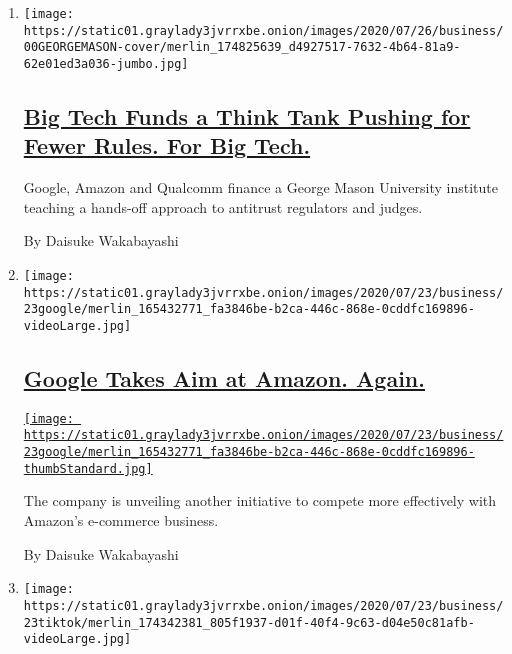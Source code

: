 \begin{enumerate}
\def\labelenumi{\arabic{enumi}.}
\item
  \texttt{[image: https://static01.graylady3jvrrxbe.onion/images/2020/07/26/business/00GEORGEMASON-cover/merlin\_174825639\_d4927517-7632-4b64-81a9-62e01ed3a036-jumbo.jpg]}

  \hypertarget{big-tech-funds-a-think-tank-pushing-for-fewer-rules-for-big-tech}{%
  \subsection{\texorpdfstring{\href{/2020/07/24/technology/global-antitrust-institute-google-amazon-qualcomm.html}{Big
  Tech Funds a Think Tank Pushing for Fewer Rules. For Big
  Tech.}}{Big Tech Funds a Think Tank Pushing for Fewer Rules. For Big Tech.}}\label{big-tech-funds-a-think-tank-pushing-for-fewer-rules-for-big-tech}}

  Google, Amazon and Qualcomm finance a George Mason University
  institute teaching a hands-off approach to antitrust regulators and
  judges.

  By Daisuke Wakabayashi
\item
  \texttt{[image: https://static01.graylady3jvrrxbe.onion/images/2020/07/23/business/23google/merlin\_165432771\_fa3846be-b2ca-446c-868e-0cddfc169896-videoLarge.jpg]}

  \hypertarget{google-takes-aim-at-amazon-again}{%
  \subsection{\texorpdfstring{\href{/2020/07/23/technology/google-ecommerce-amazon.html}{Google
  Takes Aim at Amazon.
  Again.}}{Google Takes Aim at Amazon. Again.}}\label{google-takes-aim-at-amazon-again}}

  \href{/2020/07/23/technology/google-ecommerce-amazon.html}{\texttt{[image: https://static01.graylady3jvrrxbe.onion/images/2020/07/23/business/23google/merlin\_165432771\_fa3846be-b2ca-446c-868e-0cddfc169896-thumbStandard.jpg]}}

  The company is unveiling another initiative to compete more
  effectively with Amazon's e-commerce business.

  By Daisuke Wakabayashi
\item
  \texttt{[image: https://static01.graylady3jvrrxbe.onion/images/2020/07/23/business/23tiktok/merlin\_174342381\_805f1937-d01f-40f4-9c63-d04e50c81afb-videoLarge.jpg]}

  \hypertarget{tiktoks-parent-said-to-weigh-selling-a-majority-stake-in-the-video-app}{%
}
\end{enumerate}

